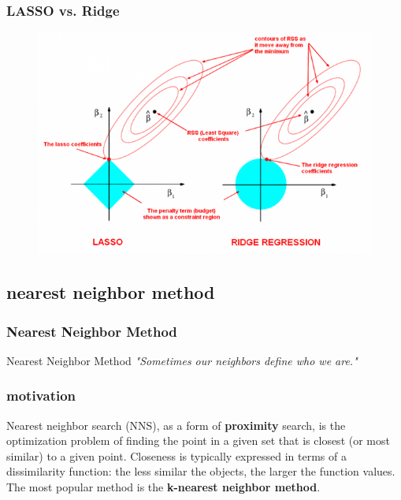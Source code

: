 \documentclass{beamer}
\begin{document}
\begin{frame}
\frametitle{LASSO vs. Ridge}
\begin{figure}
\includegraphics[width=0.9\linewidth]{figures/03/lasso_vs_ridge.png}
\end{figure}
\end{frame}



\subsection{nearest neighbor method}
\begin{frame}
\frametitle{Nearest Neighbor Method}
\Huge{Nearest Neighbor Method}
\newline
\newline
\normalsize
\textit{"Sometimes our neighbors define who we are."}
\end{frame}


\begin{frame}
\frametitle{motivation}
Nearest neighbor search (NNS), as a form of \textbf{proximity} search, is the optimization problem of finding the point in a given set that is closest (or most similar) to a given point. 
\newline
Closeness is typically expressed in terms of a dissimilarity function: the less similar the objects, the larger the function values. 
\newline
The most popular method is the \textbf{k-nearest neighbor method}.
\end{frame}
\end{document}
